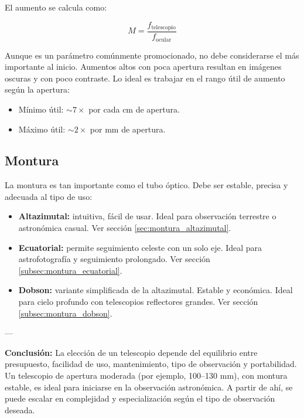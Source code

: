 El aumento se calcula como:

\[
M = \frac{f_\text{telescopio}}{f_\text{ocular}}
\]

Aunque es un parámetro comúnmente promocionado, no debe considerarse el más importante al inicio. Aumentos altos con poca apertura resultan en imágenes oscuras y con poco contraste. Lo ideal es trabajar en el rango útil de aumento según la apertura:

\begin{itemize}
	\item Mínimo útil: $\sim 7 \times$ por cada cm de apertura.
	\item Máximo útil: $\sim 2 \times$ por mm de apertura.
\end{itemize}

\subsection*{Montura}

La montura es tan importante como el tubo óptico. Debe ser estable, precisa y adecuada al tipo de uso:

\begin{itemize}
	\item \textbf{Altazimutal:} intuitiva, fácil de usar. Ideal para observación terrestre o astronómica casual. Ver sección \ref{sec:montura_altazimutal}.
	
	\item \textbf{Ecuatorial:} permite seguimiento celeste con un solo eje. Ideal para astrofotografía y seguimiento prolongado. Ver sección \ref{subsec:montura_ecuatorial}.
	
	\item \textbf{Dobson:} variante simplificada de la altazimutal. Estable y económica. Ideal para cielo profundo con telescopios reflectores grandes. Ver sección \ref{subsec:montura_dobson}.
\end{itemize}

---

\textbf{Conclusión:}  
La elección de un telescopio depende del equilibrio entre presupuesto, facilidad de uso, mantenimiento, tipo de observación y portabilidad. Un telescopio de apertura moderada (por ejemplo, 100–130 mm), con montura estable, es ideal para iniciarse en la observación astronómica. A partir de ahí, se puede escalar en complejidad y especialización según el tipo de observación deseada.

